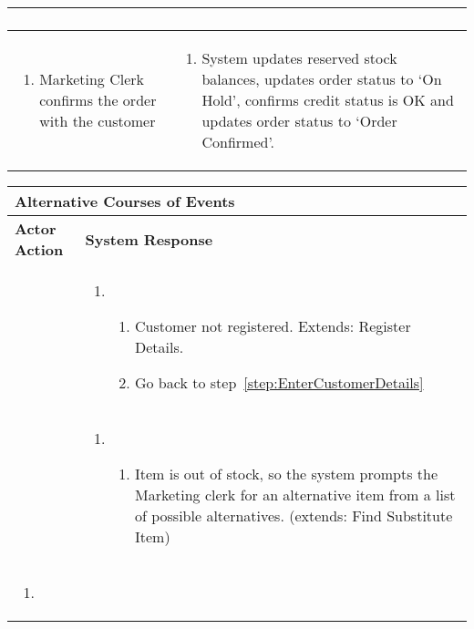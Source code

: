 \documentclass[12pt,a4paper]{article}
\newcounter{stockAvailabilityCheck}
\newcounter{checkCustomerDetails}
\begin{document}
\begin{longtable}{|p{}|p{}|}
\begin{enumerate}[resume=typical]
  \end{enumerate}
  & \\\hline
  \begin{enumerate}[resume=typical]
    \item Marketing Clerk confirms the order with the customer
  \end{enumerate}
  &
  \begin{enumerate}[resume=typical]
    \item System updates reserved stock balances, updates order status to `On
      Hold', confirms credit status is OK and updates order status to `Order
      Confirmed'.
  \end{enumerate} \\\hline
\end{longtable}

\begin{longtable}{|p{}|p{}|}\hline
  \multicolumn{2}{|p{1.095\textwidth}|}{\textbf{Alternative Courses of Events}} \\\hline
  \textbf{Actor Action} & \textbf{System Response} \\\hline
  &
  \begin{enumerate}[start=\value{checkCustomerDetails}]
    \item
      \begin{enumerate}[series=abnormal0]
        \item Customer not registered. Extends: Register Details.
        \item Go back to step~\ref{step:EnterCustomerDetails}
      \end{enumerate}
  \end{enumerate} \\\hline
  &
  \begin{enumerate}[start=\value{stockAvailabilityCheck}]
    \item
      \begin{enumerate}[series=abnormal1]
        \item Item is out of stock, so the system prompts the Marketing clerk
          for an alternative item from a list of possible alternatives.
          (extends: Find Substitute Item)
      \end{enumerate}
  \end{enumerate} \\\hline
  \begin{enumerate}[start=\value{stockAvailabilityCheck}]
    \item
      \begin{enumerate}[resume=abnormal1]

\end{enumerate}
\end{enumerate}
\end{longtable}
\end{document}
